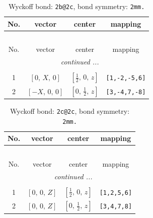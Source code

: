 \documentclass[fleqn,8pt]{jsarticle}
\begin{document}
\renewcommand{\arraystretch}{1.2}
\begin{longtable}{cccc}
\caption{Wyckoff bond: {\tt 2b@2c}, bond symmetry: {\tt 2mm.}}
 \\
 \hline \hline
No. & vector & center & mapping \\ \hline \endfirsthead

\multicolumn{3}{l}{\tablename\ \thetable{}} \\
 \hline \hline
No. & vector & center & mapping \\ \hline \endhead

 \hline \hline
\multicolumn{3}{r}{\footnotesize\it continued ...} \\ \endfoot

 \hline \hline
\multicolumn{3}{r}{} \\ \endlastfoot

1 & $\left[ 0,\, X,\, 0 \right]$ & $\left[ \frac{1}{2},\, 0,\, z \right]$ & {\tt [1,-2,-5,6]} \\ \hline
2 & $\left[ - X,\, 0,\, 0 \right]$ & $\left[ 0,\, \frac{1}{2},\, z \right]$ & {\tt [3,-4,7,-8]} \\
\end{longtable}
\renewcommand{\arraystretch}{1.2}
\begin{longtable}{cccc}
\caption{Wyckoff bond: {\tt 2c@2c}, bond symmetry: {\tt 2mm.}}
 \\
 \hline \hline
No. & vector & center & mapping \\ \hline \endfirsthead

\multicolumn{3}{l}{\tablename\ \thetable{}} \\
 \hline \hline
No. & vector & center & mapping \\ \hline \endhead

 \hline \hline
\multicolumn{3}{r}{\footnotesize\it continued ...} \\ \endfoot

 \hline \hline
\multicolumn{3}{r}{} \\ \endlastfoot

1 & $\left[ 0,\, 0,\, Z \right]$ & $\left[ \frac{1}{2},\, 0,\, z \right]$ & {\tt [1,2,5,6]} \\ \hline
2 & $\left[ 0,\, 0,\, Z \right]$ & $\left[ 0,\, \frac{1}{2},\, z \right]$ & {\tt [3,4,7,8]} \\
\end{longtable}
\renewcommand{\arraystretch}{1.2}
\end{document}
